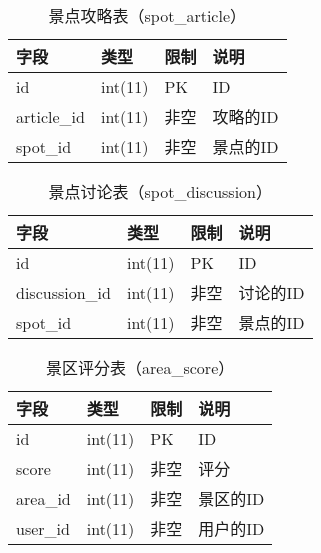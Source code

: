             \begin{table}[htbp]
                \caption{\wuhao 景点攻略表（spot\_article）}
                \vspace{0.5em}\centering\wuhao
                \begin{tabular}{llll}
                    \toprule[1.5pt]
                    字段 & 类型 & 限制 & 说明\\
                    \midrule[1pt]
                    id & int(11) & PK & ID\\
                    article\_id & int(11) & 非空 & 攻略的ID\\
                    spot\_id & int(11) & 非空 & 景点的ID\\
                    \bottomrule[1.5pt]
                \end{tabular}
            \end{table}

            \begin{table}[htbp]
                \caption{\wuhao 景点讨论表（spot\_discussion）}
                \vspace{0.5em}\centering\wuhao
                \begin{tabular}{llll}
                    \toprule[1.5pt]
                    字段 & 类型 & 限制 & 说明\\
                    \midrule[1pt]
                    id & int(11) & PK & ID\\
                    discussion\_id & int(11) & 非空 & 讨论的ID\\
                    spot\_id & int(11) & 非空 & 景点的ID\\
                    \bottomrule[1.5pt]
                \end{tabular}
            \end{table}

            \begin{table}[htbp]
                \caption{\wuhao 景区评分表（area\_score）}
                \vspace{0.5em}\centering\wuhao
                \begin{tabular}{llll}
                    \toprule[1.5pt]
                    字段 & 类型 & 限制 & 说明\\
                    \midrule[1pt]
                    id & int(11) & PK & ID\\
                    score & int(11) & 非空 & 评分\\
                    area\_id & int(11) & 非空 & 景区的ID\\
                    user\_id & int(11) & 非空 & 用户的ID\\
                    \bottomrule[1.5pt]
                \end{tabular}
            \end{table}


